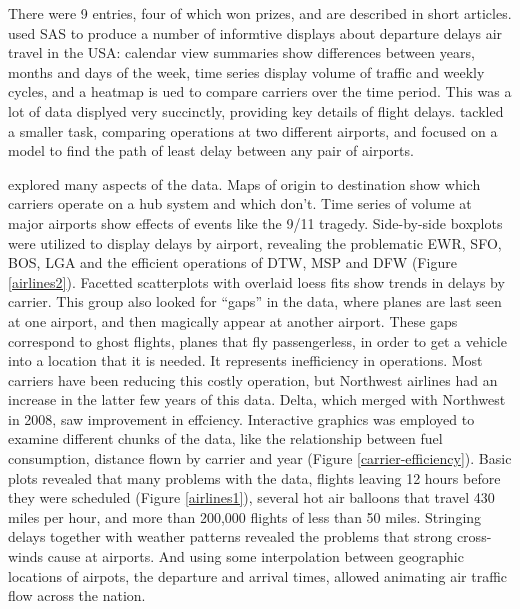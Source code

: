 \documentclass{article}
\begin{document}
There were 9 entries, four of which won prizes, and are described in short articles. \citet{expo-wicklin} used SAS to produce a number of informtive displays about departure delays air travel in the USA: calendar view summaries show differences between years, months and days of the week, time series display volume of traffic and weekly cycles, and a heatmap is ued to compare carriers over the time period. This was a lot of data displyed very succinctly, providing key details of flight delays. \citet{expo-wickham} tackled a smaller task, comparing operations at two different airports, and \citet{expo-dey} focused on a model to find the path of least delay between any pair of airports. 

\citet{expo-hofmann} explored many aspects of the data. Maps of origin to destination show which carriers operate on a hub system and which don't. Time series of volume at major airports show effects of events like the 9/11 tragedy. Side-by-side boxplots were utilized to display delays by airport, revealing the problematic EWR, SFO, BOS, LGA and the efficient operations of DTW, MSP and DFW (Figure \ref{airlines2}). Facetted scatterplots with overlaid loess fits show trends in delays by carrier. This group also looked for ``gaps'' in the data, where planes are last seen at one airport, and then magically appear at another airport. These gaps correspond to ghost flights, planes that fly passengerless, in order to get a vehicle into a location that it is needed. It represents inefficiency in operations. Most carriers have been reducing this costly operation, but Northwest airlines had an increase in the latter few years of this data. Delta, which merged with Northwest in 2008, saw improvement in effciency. Interactive graphics was employed to examine different chunks of the data, like the relationship between fuel consumption, distance flown by carrier and year (Figure \ref{carrier-efficiency}). Basic plots revealed that many problems with the data, flights leaving 12 hours before they were scheduled (Figure \ref{airlines1}), several hot air balloons that travel 430 miles per hour, and more than 200,000 flights of less than 50 miles. Stringing delays together with weather patterns revealed the problems that strong cross-winds cause at airports. And using some interpolation between geographic locations of airpots, the departure and arrival times, allowed animating air traffic flow across the nation.  
\end{document}
